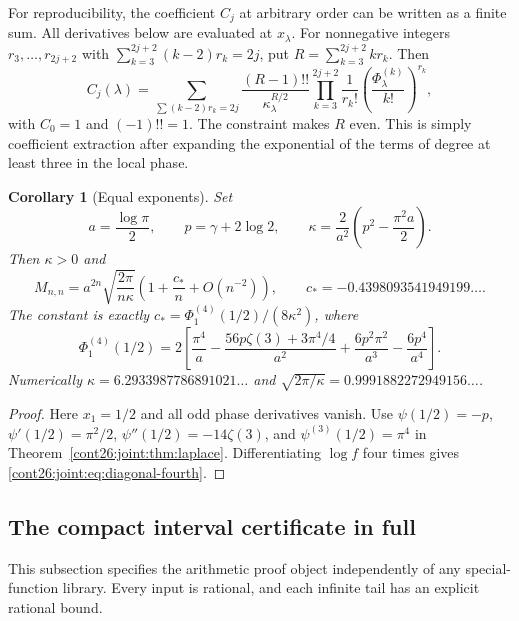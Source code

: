 \documentclass[11pt,letterpaper]{article}
\numberwithin{equation}{section}
\theoremstyle{plain}
\newtheorem{corollary}[theorem]{Corollary}
\theoremstyle{definition}
\theoremstyle{remark}
\begin{document}
For reproducibility, the coefficient $C_j$ at arbitrary order can be
written as a finite sum.  All derivatives below are evaluated at
$x_\lambda$.  For nonnegative integers $r_3,\ldots,r_{2j+2}$ with
$\sum_{k=3}^{2j+2}(k-2)r_k=2j$, put
$R=\sum_{k=3}^{2j+2}k r_k$.  Then
\begin{equation}\label{cont26:joint:eq:allorders}
 C_j(\lambda)=
 \sum_{\sum(k-2)r_k=2j}
 \frac{(R-1)!!}{\kappa_\lambda^{R/2}}
 \prod_{k=3}^{2j+2}
 \frac1{r_k!}\left(\frac{\Phi_\lambda^{(k)}}{k!}\right)^{r_k},
\end{equation}
with $C_0=1$ and $(-1)!!=1$.  The constraint makes $R$ even.
This is simply coefficient extraction after expanding the exponential
of the terms of degree at least three in the local phase.

\begin{corollary}[Equal exponents]
\label{cont26:joint:cor:diagonal}
Set
\[
 a=\frac{\log\pi}{2},\qquad p=\gamma+2\log2,\qquad
 \kappa=\frac{2}{a^2}\left(p^2-\frac{\pi^2a}{2}\right).
\]
Then $\kappa>0$ and
\begin{equation}\label{cont26:joint:eq:diagonal}
 M_{n,n}=a^{2n}\sqrt{\frac{2\pi}{n\kappa}}
 \left(1+\frac{c_*}{n}+O(n^{-2})\right),
 \qquad c_*=-0.4398093541949199\ldots.
\end{equation}
The constant is exactly $c_*=\Phi_1^{(4)}(1/2)/(8\kappa^2)$, where
\begin{equation}\label{cont26:joint:eq:diagonal-fourth}
 \Phi_1^{(4)}(1/2)=2\left[
 \frac{\pi^4}{a}
 -\frac{56p\zeta(3)+3\pi^4/4}{a^2}
 +\frac{6p^2\pi^2}{a^3}
 -\frac{6p^4}{a^4}\right].
\end{equation}
Numerically $\kappa=6.2933987786891021\ldots$ and
$\sqrt{2\pi/\kappa}=0.9991882272949156\ldots$.
\end{corollary}
\begin{proof}
Here $x_1=1/2$ and all odd phase derivatives vanish.  Use
$\psi(1/2)=-p$, $\psi'(1/2)=\pi^2/2$,
$\psi''(1/2)=-14\zeta(3)$, and $\psi^{(3)}(1/2)=\pi^4$ in
Theorem~\ref{cont26:joint:thm:laplace}.  Differentiating $\log f$ four
times gives \eqref{cont26:joint:eq:diagonal-fourth}.
\end{proof}

\subsection{The compact interval certificate in full}
\label{cont26:joint:subsec:certificate}

This subsection specifies the arithmetic proof object independently
of any special-function library.  Every input is rational, and each
infinite tail has an explicit rational bound.
\end{document}
